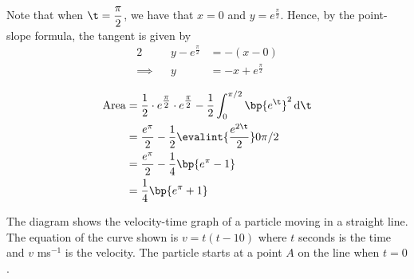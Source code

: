 \documentclass{echw}
\begin{document}
        Note that when $\t = \dfrac\pi2$, we have that $x = 0$ and $y = e^{\tfrac\pi2}$. Hence, by the point-slope formula, the tangent is given by
        \begin{alignat*}{2}
            &&y - e^{\tfrac\pi2} &= -(x - 0)\\
            \implies&&y &= -x + e^{\tfrac\pi2}
        \end{alignat*}


        \begin{align*}
            \area &= \dfrac12 \cdot e^{\tfrac\pi2} \cdot e^{\tfrac\pi2} - \dfrac12 \int_0^{\pi/2} \bp{e^\t}^2 \d \t\\
            &= \dfrac{e^\pi}2 - \dfrac12 \evalint{\dfrac{e^{2\t}}2}0{\pi/2}\\
            &= \dfrac{e^\pi}2 - \dfrac14 \bp{e^\pi - 1}\\
            &= \dfrac14 \bp{e^\pi + 1}
        \end{align*}


    \problem{}
        \begin{center}
        \end{center}
        The diagram shows the velocity-time graph of a particle moving in a straight line. The equation of the curve shown is $v = t(t - 10)$ where $t$ seconds is the time and $v$ ms$^{-1}$ is the velocity. The particle starts at a point $A$ on the line when $t = 0$.
\end{document}
